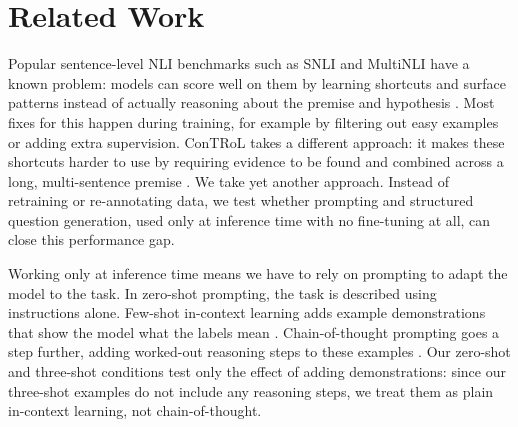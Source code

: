 \documentclass[11pt]{article}
\begin{document}
\section{Related Work}

Popular sentence-level NLI benchmarks such as SNLI and MultiNLI
\citep{bowman-etal-2015-large,williams-etal-2018-broad} have a known problem:
models can score well on them by learning shortcuts and surface patterns
instead of actually reasoning about the premise and hypothesis
\citep{gururangan-etal-2018-annotation,mccoy-etal-2019-right}. Most fixes for
this happen during training, for example by filtering out easy examples or
adding extra supervision. ConTRoL takes a different approach: it makes these
shortcuts harder to use by requiring evidence to be found and combined across
a long, multi-sentence premise \citep{liu-etal-2021-natural}. We take yet
another approach. Instead of retraining or re-annotating data, we test
whether prompting and structured question generation, used only at inference
time with no fine-tuning at all, can close this performance gap.

Working only at inference time means we have to rely on prompting to adapt
the model to the task. In zero-shot prompting, the task is described using
instructions alone. Few-shot in-context learning adds example demonstrations
that show the model what the labels mean \citep{brown2020language}.
Chain-of-thought prompting goes a step further, adding worked-out reasoning
steps to these examples \citep{wei2022chain}. Our zero-shot and three-shot
conditions test only the effect of adding demonstrations: since our
three-shot examples do not include any reasoning steps, we treat them as
plain in-context learning, not chain-of-thought.
\end{document}
